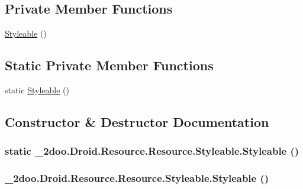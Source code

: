 \subsection*{Private Member Functions}
\begin{CompactItemize}
\item 
\hyperlink{class__2doo_1_1_droid_1_1_resource_1_1_styleable_590bb1e76e41bb2a4644ba5e4ab60087}{Styleable} ()
\end{CompactItemize}
\subsection*{Static Private Member Functions}
\begin{CompactItemize}
\item 
static \hyperlink{class__2doo_1_1_droid_1_1_resource_1_1_styleable_b0fb583a22d5ba66dfddb1a51ca7e5dc}{Styleable} ()
\end{CompactItemize}


\subsection{Constructor \& Destructor Documentation}
\hypertarget{class__2doo_1_1_droid_1_1_resource_1_1_styleable_b0fb583a22d5ba66dfddb1a51ca7e5dc}{
\subsubsection[{Styleable}]{\setlength{\rightskip}{0pt plus 5cm}static \_\-2doo.Droid.Resource.Resource.Styleable.Styleable ()}}
\label{class__2doo_1_1_droid_1_1_resource_1_1_styleable_b0fb583a22d5ba66dfddb1a51ca7e5dc}


\hypertarget{class__2doo_1_1_droid_1_1_resource_1_1_styleable_590bb1e76e41bb2a4644ba5e4ab60087}{
\subsubsection[{Styleable}]{\setlength{\rightskip}{0pt plus 5cm}\_\-2doo.Droid.Resource.Resource.Styleable.Styleable ()}}
\label{class__2doo_1_1_droid_1_1_resource_1_1_styleable_590bb1e76e41bb2a4644ba5e4ab60087}




